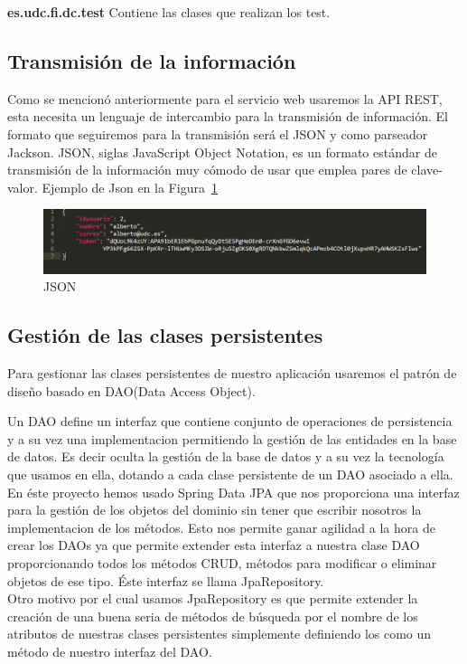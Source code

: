 \textbf{es.udc.fi.dc.test} Contiene las clases que realizan los test.
\subsection{Transmisión de la información}
Como se mencionó anteriormente para el servicio web usaremos la API REST, esta necesita un lenguaje de intercambio para la transmisión de información. El formato que seguiremos para la transmisión será el JSON y como parseador Jackson.
JSON, siglas JavaScript Object Notation, es un formato estándar de transmisión de la información muy cómodo de usar que emplea pares de clave-valor. 	Ejemplo de Json en la Figura~\ref{fig:json}
	\begin{figure}
		\centering
		\includegraphics[width=\textwidth] {json.PNG}
		\caption{JSON }
		\label{fig:json}
	\end{figure}
\subsection{Gestión de las clases persistentes}
Para gestionar las clases persistentes de nuestro aplicación usaremos el patrón de diseño basado en DAO(Data Access Object).

 Un DAO define un interfaz que contiene conjunto de operaciones de persistencia y a su vez una implementacion permitiendo la gestión de las entidades en la base de datos. Es decir oculta la gestión de la base de datos y a su vez la tecnología que usamos en ella, dotando a cada clase persistente de un DAO asociado a ella. En éste proyecto hemos usado Spring Data JPA que nos proporciona una interfaz para la gestión de los objetos del dominio sin tener que escribir nosotros la implementacion de los métodos. Esto nos permite ganar agilidad a la hora de crear los DAOs ya que permite extender esta interfaz a nuestra clase DAO proporcionando todos los métodos CRUD, métodos para modificar o eliminar objetos de ese tipo. Éste interfaz se llama JpaRepository.\\


Otro motivo por el cual usamos JpaRepository es que permite extender la creación de una buena seria de métodos de búsqueda por el nombre de los atributos de nuestras clases persistentes simplemente definiendo los como un método de nuestro interfaz del DAO.
	
